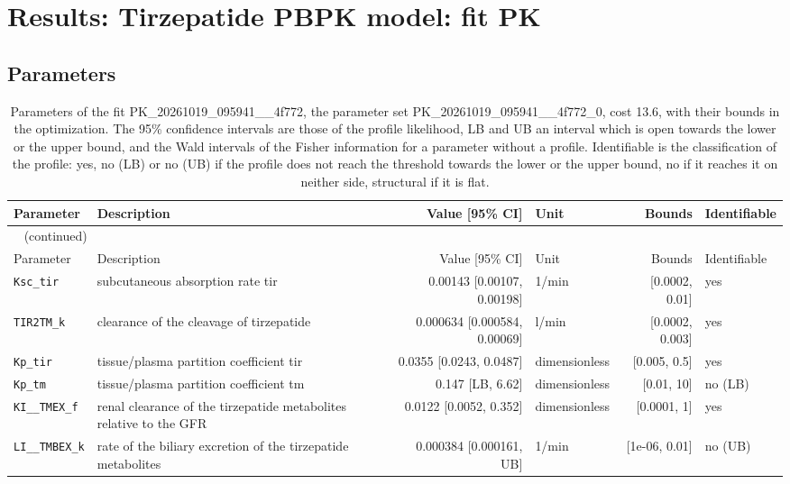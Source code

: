 \documentclass{article}
\begin{document}
\section{Results: Tirzepatide PBPK model: fit PK}

\subsection{Parameters}

\begin{longtable}{llrlrl}
\caption{Parameters of the fit PK\_20261019\_095941\_\_4f772, the parameter set PK\_20261019\_095941\_\_4f772\_0, cost 13.6, with their bounds in the optimization. The 95\% confidence intervals are those of the profile likelihood, LB and UB an interval which is open towards the lower or the upper bound, and the Wald intervals of the Fisher information for a parameter without a profile. Identifiable is the classification of the profile: yes, no (LB) or no (UB) if the profile does not reach the threshold towards the lower or the upper bound, no if it reaches it on neither side, structural if it is flat.}\label{tab:parameters:PK_20261019_095941__4f772} \\
\toprule
Parameter & Description & Value [95\% CI] & Unit & Bounds & Identifiable \\
\midrule
\endfirsthead
\multicolumn{6}{l}{\small\tablename~\thetable{} (continued)} \\
\toprule
Parameter & Description & Value [95\% CI] & Unit & Bounds & Identifiable \\
\midrule
\endhead
\bottomrule
\endlastfoot
\texttt{Ksc\_tir} & subcutaneous absorption rate tir & 0.00143 [0.00107, 0.00198] & 1/min & [0.0002, 0.01] & yes \\
\texttt{TIR2TM\_k} & clearance of the cleavage of tirzepatide & 0.000634 [0.000584, 0.00069] & l/min & [0.0002, 0.003] & yes \\
\texttt{Kp\_tir} & tissue/plasma partition coefficient tir & 0.0355 [0.0243, 0.0487] & dimensionless & [0.005, 0.5] & yes \\
\texttt{Kp\_tm} & tissue/plasma partition coefficient tm & 0.147 [LB, 6.62] & dimensionless & [0.01, 10] & no (LB) \\
\texttt{KI\_\_TMEX\_f} & renal clearance of the tirzepatide metabolites relative to the GFR & 0.0122 [0.0052, 0.352] & dimensionless & [0.0001, 1] & yes \\
\texttt{LI\_\_TMBEX\_k} & rate of the biliary excretion of the tirzepatide metabolites & 0.000384 [0.000161, UB] & 1/min & [1e-06, 0.01] & no (UB) \\
\end{longtable}
\end{document}
